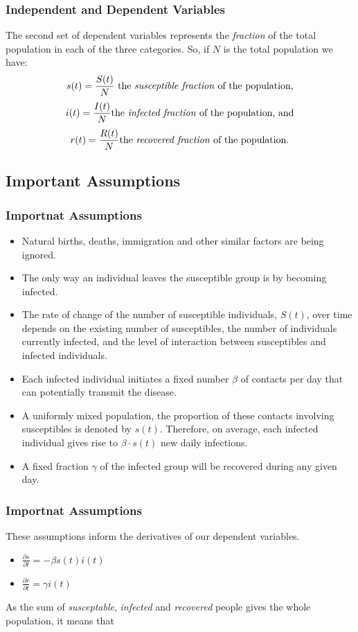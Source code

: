 \documentclass{beamer}
\begin{document}
\begin{frame}\frametitle{Independent and Dependent Variables}
The second set of dependent variables represents the \textit{fraction} of the total population in
each of the three categories. So, if $N$ is the total population we have:
    $$s(t) = \frac{S(t)}{N}\text{ the \textit{susceptible fraction} of the population,}$$
    $$i(t) = \frac{I(t)}{N}\text{the \textit{infected fraction} of the population, and}$$
    $$r(t) = \frac{R(t)}{N}\text{the \textit{recovered fraction} of the population.}$$
\end{frame}

\subsection{Important Assumptions}
\begin{frame}\frametitle{Importnat Assumptions}
    \begin{itemize}
        \item Natural births, deaths, immigration and other similar factors are being ignored.
        \item The only way an individual leaves the susceptible group is by becoming infected.
        \item The rate of change of the number of susceptible individuals, $S(t)$, over time depends on the existing number of susceptibles, the number of individuals currently infected, and the level of interaction between susceptibles and infected individuals.
        \item Each infected individual initiates a fixed number $\beta$ of contacts per day that can potentially transmit the disease.
        \item A uniformly mixed population, the proportion of these contacts involving susceptibles is denoted by $s(t)$. Therefore, on average, each
infected individual gives rise to $\beta \cdot s(t)$ new daily infections.
        \item A fixed fraction $\gamma$ of the infected group will be recovered during any given day.
    \end{itemize}
\end{frame}

\begin{frame}[t]\frametitle{Importnat Assumptions}
These assumptions inform the derivatives of our dependent variables.
    \begin{itemize}
        \item $\frac{\partial{s}}{\partial{t}}=-\beta s(t)i(t)$
        \item $\frac{\partial{r}}{\partial{t}}=\gamma i(t)$
    \end{itemize}
As the sum of \textit{susceptable}, \textit{infected} and \textit{recovered} people gives the whole population, it means that
\end{frame}
\end{document}
